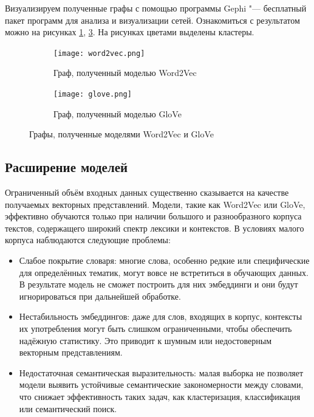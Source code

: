 \documentclass[coursework]{SCWorks}
\begin{document}
Визуализируем полученные графы с помощью программы Gephi "--- бесплатный пакет программ для анализа и визуализации сетей. Ознакомиться с результатом можно на рисунках \ref{fig:graph-word2vec}, \ref{fig:graph-glove}. На рисунках цветами выделены кластеры.
\begin{figure}[!ht]
    \centering
    \begin{subfigure}[b]{0.4\textwidth}
        \centering
        \texttt{[image: word2vec.png]}
        \caption{Граф, полученный моделью Word2Vec}
        \label{fig:graph-word2vec}
    \end{subfigure}
    \begin{subfigure}[b]{0.4\textwidth}
        \centering
        \texttt{[image: glove.png]}
        \caption{Граф, полученный моделью GloVe}
        \label{fig:graph-glove}
    \end{subfigure}
    \caption{Графы, полученные моделями Word2Vec и GloVe}
\end{figure}

\subsection{Расширение моделей}
Ограниченный объём входных данных существенно сказывается на качестве получаемых векторных представлений. Модели, такие как Word2Vec или GloVe, эффективно обучаются только при наличии большого и разнообразного корпуса текстов, содержащего широкий спектр лексики и контекстов. В условиях малого корпуса наблюдаются следующие проблемы:
\begin{itemize}
    \item Слабое покрытие словаря: многие слова, особенно редкие или специфические для определённых тематик, могут вовсе не встретиться в обучающих данных. В результате модель не сможет построить для них эмбеддинги и они будут игнорироваться при дальнейшей обработке.

    \item Нестабильность эмбеддингов: даже для слов, входящих в корпус, контексты их употребления могут быть слишком ограниченными, чтобы обеспечить надёжную статистику. Это приводит к шумным или недостоверным векторным представлениям.

    \item Недостаточная семантическая выразительность: малая выборка не позволяет модели выявить устойчивые семантические закономерности между словами, что снижает эффективность таких задач, как кластеризация, классификация или семантический поиск.
\end{itemize}
\end{document}
